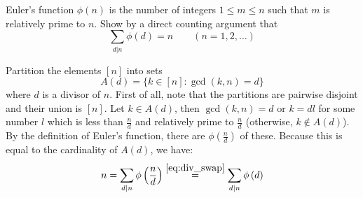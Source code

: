 \begin{exercise}
    \label{ex:2-14}
    Euler's function $\phi(n)$ is the number of integers $1\leq m\leq n$ such that $m$ is relatively prime to $n$. Show by a direct counting argument that 
    \[
        \sum_{d\vert n} \phi(d) = n \qquad (n=1,2,\ldots)
    \]
\end{exercise}
\begin{solution}
    Partition the elements $[n]$ into sets
    \[
        A(d) = \{k \in [n] : \gcd(k, n) = d\}
    \]
    where $d$ is a divisor of $n$. First of all, note that the partitions are pairwise disjoint and their union is $[n]$. Let $k \in A(d)$, then $\gcd(k, n) = d$ or $k = dl$ for some number $l$ which is less than $\frac{n}{d}$ and relatively prime to $\frac{n}{d}$ (otherwise, $k\notin A(d)$). By the definition of Euler's function, there are $\phi\left(\frac{n}{d}\right)$ of these. Because this is equal to the cardinality of $A(d)$, we have:
    \[
        n = \sum_{d\vert n} \phi\left(\frac{n}{d}\right) \overset{\eqref{eq:div_swap}}{=} \sum_{d\vert n} \phi\left(d\right)
    \]
\end{solution}

